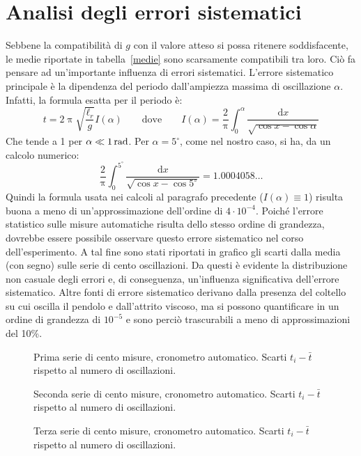 \documentclass[italian,a4paper]{article}
\newcommand{\di}{\mathrm{d}} %
\renewcommand{\pi}{\uppi} %
\begin{document}
\section{Analisi degli errori sistematici}
Sebbene la compatibilità di $g$ con il valore atteso si possa ritenere soddisfacente, le medie riportate in tabella~\ref{medie} sono scarsamente compatibili tra loro. Ciò fa pensare ad un'importante influenza di errori sistematici.  L'errore sistematico principale è la dipendenza del periodo dall'ampiezza massima di oscillazione $\alpha$. Infatti, la formula esatta per il periodo è:
\begin{equation*}
 t=2\pi\sqrt{\dfrac{\ell_r}{g}}I(\alpha) \qquad \text{dove} \qquad I(\alpha) =\dfrac 2 \pi \int_0^{\alpha} \dfrac{\di x}{\sqrt{\cos x - \cos \alpha}}
\end{equation*}
Che tende a 1 per $\alpha \ll \unit[1]{rad}$. Per $\alpha = 5^\circ$, come nel nostro caso, si ha, da un calcolo numerico:
\begin{equation*}
\dfrac 2 \pi \int_0^{5^\circ} \dfrac{\di x}{\sqrt{\cos x - \cos 5^\circ}} = 1.0004058\dots
\end{equation*}
Quindi la formula usata nei calcoli al paragrafo precedente ($I(\alpha) \equiv 1$) risulta buona a meno di un'approssimazione dell'ordine di $4\cdot10^{-4}$. Poiché l'errore statistico sulle misure automatiche risulta dello stesso ordine di grandezza, dovrebbe essere possibile osservare questo errore sistematico nel corso dell'esperimento. A tal fine sono stati riportati in grafico gli scarti dalla media (con segno) sulle serie di cento oscillazioni. Da questi è evidente la distribuzione non casuale degli errori e, di conseguenza, un'influenza significativa dell'errore sistematico.
Altre fonti di errore sistematico derivano dalla presenza del coltello su cui oscilla il pendolo e dall'attrito viscoso, ma si possono quantificare in un ordine di grandezza di $10^{-5}$ e sono perciò trascurabili a meno di approssimazioni del 10\%.
\begin{figure}[hp]
\centering
\caption{Prima serie di cento misure, cronometro automatico. Scarti $t_i - \bar{t}$ rispetto al numero di oscillazioni.}\label{scarti1}
 
\end{figure}
\begin{figure}[hp]
\centering
\caption{Seconda serie di cento misure, cronometro automatico. Scarti $t_i - \bar{t}$ rispetto al numero di oscillazioni.}\label{scarti2}
 
\end{figure}
\begin{figure}[hp]
\centering
\caption{Terza serie di cento misure, cronometro automatico. Scarti $t_i - \bar{t}$ rispetto al numero di oscillazioni.}\label{scarti3}
 
\end{figure}
\end{document}
